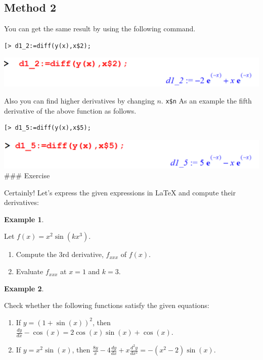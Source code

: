 \documentclass[
]{book}
\providecommand{\tightlist}{%
  \setlength{\itemsep}{0pt}\setlength{\parskip}{0pt}}
\theoremstyle{definition}
\theoremstyle{definition}
\newtheorem{example}{Example}[chapter]
\theoremstyle{definition}
\theoremstyle{definition}
\theoremstyle{remark}
\begin{document}
\subsection{Method 2}\label{method-2}

You can get the same result by using the following command.

\begin{verbatim}
[> d1_2:=diff(y(x),x$2);
\end{verbatim}

\includegraphics{figures/Diff/Diff 6.2 -2.png}

Also you can find higher derivatives by changing \(n\). \texttt{x\$n} As an example the fifth derivative of the above function as follows.

\begin{verbatim}
[> d1_5:=diff(y(x),x$5);
\end{verbatim}

\includegraphics{figures/Diff/Diff 6.2 -3.png}
\#\#\# Exercise

Certainly! Let's express the given expressions in LaTeX and compute their derivatives:

\begin{example}
\protect\hypertarget{exm:unnamed-chunk-28}{}\label{exm:unnamed-chunk-28}

Let \(f(x) = x^2 \sin(kx^3)\).

\begin{enumerate}
\def\labelenumi{(\roman{enumi})}
\tightlist
\item
  Compute the 3rd derivative, \(f_{xxx}\) of \(f(x)\).
\item
  Evaluate \(f_{xxx}\) at \(x = 1\) and \(k = 3\).
\end{enumerate}

\end{example}

\begin{example}
\protect\hypertarget{exm:unnamed-chunk-29}{}\label{exm:unnamed-chunk-29}

Check whether the following functions satisfy the given equations:

\begin{enumerate}
\def\labelenumi{(\roman{enumi})}
\tightlist
\item
  If \(y = {(1 + \sin(x))^2}\), then \(\frac{dy}{dx} - \cos(x) = 2\cos(x)\sin(x) + \cos(x)\).
\item
  If \(y = x^2 \sin(x)\), then \(\frac{8y}{x} - 4\frac{dy}{dx} + x\frac{d^2y}{dx^2} = -(x^2 - 2)\sin(x)\).
\end{enumerate}

\end{example}
\end{document}
